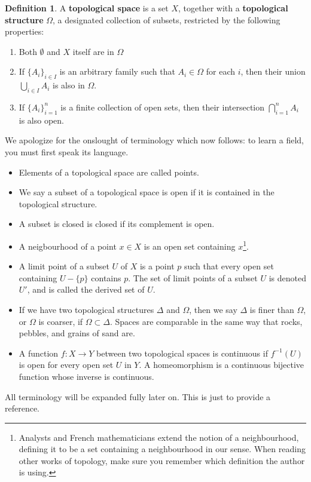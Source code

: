 \documentclass{report}
\theoremstyle{plain}
\theoremstyle{definition}
\newtheorem*{defi}{Definition}
\newenvironment{definition}
    {\begin{samepage}\begin{framed}\begin{defi}}
    {\end{defi}\end{framed}\end{samepage}}
\begin{document}
\begin{definition}
    A {\bf topological space} is a set $X$, together with a {\bf topological structure} $\Omega$, a designated collection of subsets, restricted by the following properties:
    \begin{enumerate}
        \item Both $\emptyset$ and $X$ itself are in $\Omega$
        \item If $\{A_i\}_{i \in I}$ is an arbitrary family such that $A_i \in \Omega$ for each $i$, then their union $\bigcup_{i \in I} A_i$ is also in $\Omega$.
        \item If $\{A_i\}_{i = 1}^n$ is a finite collection of open sets, then their intersection $\bigcap_{i = 1}^n A_i$ is also open.
    \end{enumerate}
    We apologize for the onslought of terminology which now follows: to learn a field, you must first speak its language.
    \begin{itemize}
        \item Elements of a topological space are called points.
        \item We say a subset of a topological space is open if it is contained in the topological structure.
        \item A subset is closed is closed if its complement is open.
        \item A neigbourhood of a point $x \in X$ is an open set containing $x$\footnote{Analysts and French mathematicians extend the notion of a neighbourhood, defining it to be a set containing a neighbourhood in our sense. When reading other works of topology, make sure you remember which definition the author is using.}.
        \item A limit point of a subset $U$ of $X$ is a point $p$ such that every open set containing $U - \{p\}$ contains $p$. The set of limit points of a subset $U$ is denoted $U'$, and is called the derived set of $U$.
        \item If we have two topological structures $\Delta$ and $\Omega$, then we say $\Delta$ is finer than $\Omega$, or $\Omega$ is coarser, if $\Omega \subset \Delta$. Spaces are comparable in the same way that rocks, pebbles, and grains of sand are.
        \item A function $f:X \to Y$ between two topological spaces is continuous if $f^{-1}(U)$ is open for every open set $U$ in $Y$. A homeomorphism is a continuous bijective function whose inverse is continuous.
    \end{itemize}
    All terminology will be expanded fully later on. This is just to provide a reference.
\end{definition}
\end{document}
